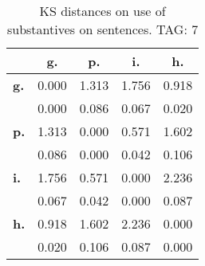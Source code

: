 \begin{table}[h!]
\begin{center}
\begin{tabular}{| l || c | c | c | c |}\hline
 & {\bf g.} & {\bf p.} & {\bf i.} & {\bf h.} \\\hline\hline
{\bf g.} & 0.000 & 1.313 & 1.756 & 0.918 \\
{\bf } & 0.000 & 0.086 & 0.067 & 0.020 \\\hline
{\bf p.} & 1.313 & 0.000 & 0.571 & 1.602 \\
{\bf } & 0.086 & 0.000 & 0.042 & 0.106 \\\hline
{\bf i.} & 1.756 & 0.571 & 0.000 & 2.236 \\
{\bf } & 0.067 & 0.042 & 0.000 & 0.087 \\\hline
{\bf h.} & 0.918 & 1.602 & 2.236 & 0.000 \\
{\bf } & 0.020 & 0.106 & 0.087 & 0.000 \\\hline
\end{tabular}
\caption{KS distances on use of substantives on sentences. TAG: 7}
\end{center}
\end{table}